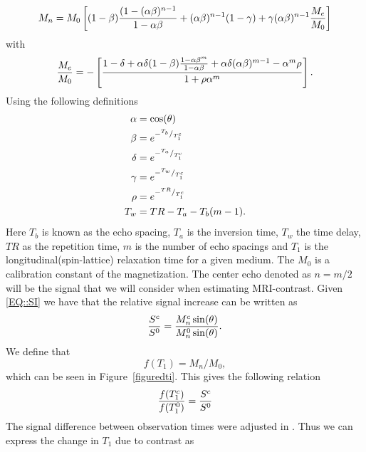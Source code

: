 \documentclass[12pt,a4paper]{article}
\begin{document}
\begin{equation}
M_{n} = M_{0}  \left[ (1-\beta)\frac{(1-(\alpha \beta)\sp{n-1} }{1-\alpha\beta} + (\alpha \beta)\sp{n-1}(1-\gamma) + \gamma ( \alpha \beta)\sp{n-1} \frac{M_{e}}{M_{0}}  \right]   
\end{equation}
with 
\begin{equation}
\frac{M_{e}}{M_{0}} = - \left[ \frac{ 1 -\delta + \alpha \delta (1-\beta ) \frac{1-\alpha\beta\sp{m}}{1-\alpha \beta} + \alpha\delta(\alpha\beta)\sp{m-1} - \alpha\sp{m}\rho}{1 +\rho \alpha\sp{m} } \right].
\end{equation}
Using the following definitions
\begin{equation}
\begin{aligned}
\alpha &= \cos ( \theta ) \\
\beta  &= e\sp{- \sp{T_b}/_{T_1\sp{c}} } \\
\delta &= e\sp{- \sp{T_a}/_{T_1\sp{c}} } \\
\gamma &= e\sp{- \sp{T_w}/_{T_1\sp{c}} } \\
\rho   &= e\sp{- \sp{TR}/_{T_1\sp{c}}}  \\
T_w    &= TR - T_a -T_b(m-1)       .\\
\end{aligned}
\end{equation}
Here $T_b$ is known as the echo spacing, $T_a$ is the inversion time, $T_w$ the time delay, $TR$ as the repetition time, $m$ is the number of echo spacings and $T_1$ is the longitudinal(spin-lattice) relaxation time for a given medium. The $M_0$ is a calibration constant of the magnetization. The center echo denoted as $n=m/2$ will be the signal that we will consider when estimating MRI-contrast. Given \eqref{EQ::SI} we have that the relative signal increase can be written as 
\begin{equation}
\frac{S\sp{c}}{S\sp{0}} = \frac{ M_{n}\sp{c} \sin (\theta)}{ M_{n}\sp{0} \sin (\theta) }.
\end{equation}
We define that  
\begin{equation}
f(T_1) = M_{n}/M_{0} ,
\label{scaledmagnetization}
\end{equation}
which can be seen in Figure~\ref{figuredti}. 
This gives the following relation 
\begin{equation}
\frac{f(T_{1}\sp{c} ) }{f(T_{1}\sp{0})}  = \frac{S\sp{c}}{S\sp{0}} 
\end{equation}
The signal difference between observation times were adjusted in \cite{ringstad2018brain}. Thus we can express the change in $T_1$ due to contrast as 
\end{document}
